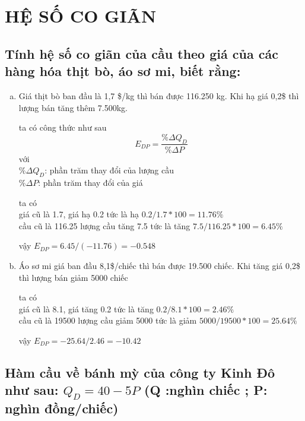 \chapter{HỆ SỐ CO GIÃN}

\section{Tính hệ số co giãn của cầu theo giá của các hàng hóa thịt bò, áo sơ mi, biết rằng:}

\begin{enumerate}[a.]
  \item  Giá thịt bò ban đầu là 1,7 \$/kg thì bán được 116.250 kg. Khi hạ giá 0,2\$ thì lượng bán tăng thêm 7.500kg.

        ta có công thức như sau
        \[ E_{DP} = \frac{\%\Delta Q_D}{\%\Delta P} \]
        với \\
        $\%\Delta Q_D$: phần trăm thay đổi của lượng cầu \\
        $\%\Delta P$: phần trăm thay đổi của giá

        ta có \\
        giá cũ là 1.7, giá hạ 0.2 tức là hạ $0.2/1.7 * 100 = 11.76\%$\\
        cầu cũ là 116.25 lượng cầu tăng 7.5 tức là tăng
        $7.5/116.25 * 100 = 6.45\%$

        vậy $E_{DP} = 6.45/(-11.76) = -0.548$


  \item Áo sơ mi giá ban đầu 8,1\$/chiếc thì bán được 19.500 chiếc. Khi tăng giá 0,2\$ thì lượng bán giảm 5000 chiếc

        ta có \\
        giá cũ là 8.1, giá tăng 0.2 tức là tăng $0.2/8.1 * 100 = 2.46\%$\\
        cầu cũ là 19500 lượng cầu giảm 5000 tức là giảm
        $5000/19500 * 100 = 25.64\%$

        vậy $E_{DP} = -25.64/2.46 = -10.42$
\end{enumerate}

\section{Hàm cầu về bánh mỳ của công ty Kinh Đô như sau: $Q_D = 40 - 5P$ (Q :nghìn chiếc ; P: nghìn đồng/chiếc)}

